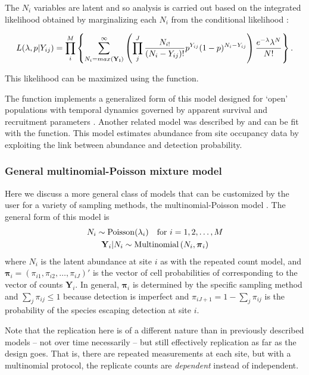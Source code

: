 \documentclass[article,shortnames]{jss}
\DeclareMathOperator{\Poi}{Poisson}
\DeclareMathOperator{\MN}{Multinomial}
\begin{document}
The $N_{i}$ variables are latent and so analysis is carried out based on 
the integrated likelihood obtained by marginalizing each $N_{i}$ from the 
conditional likelihood \citep{Royle2004b}:

\begin{equation}
L(\lambda, p | Y_{ij}) = 
 \prod_{i}^{M} 
 \left\{ \sum_{N_{i}=max({\bf Y_i})}^{\infty}
          \left( \prod_{j}^{J} 
     \frac{N_{i!}}{ (N_{i}-Y_{ij})!} p^{Y_{ij}}(1-p)^{N_{i}-Y_{ij}} \right)
       \frac{e^{-\lambda} \lambda^N}{N!} \right\}.
\end{equation}

This likelihood can be maximized using the  function.  

The function  implements a generalized form of this model
designed for `open' populations with temporal dynamics governed by 
apparent survival and recruitment parameters \citep{DailMadsen2011}. Another
related model was described by \citet{Royle2003} and can be fit with the 
 function. This model estimates abundance from site occupancy data  
by exploiting the link between abundance and detection probability. 
     
\subsubsection{General multinomial-Poisson mixture model}
\label{sec:gener-mult-poiss}
Here we discuss a more general class of models that can be customized by the
user for a variety of sampling methods, the multinomial-Poisson model
\citep{Royle2004a}.   The general form of this model is
\begin{gather}
\label{eq:mp2}
  N_i \sim \Poi(\lambda_i) \text{\quad for $i=1,2,\dots,M$}  \notag \\
  \mathbf Y_i | N_{i} \sim \MN\left(N_i, \boldsymbol \pi_i \right) \notag \\
\end{gather}
where $N_i$ is the latent abundance at site $i$ as with the repeated
count model, and $\boldsymbol \pi_i=(\pi_{i1},\pi_{i2},\dots,\pi_{iJ})'$ is
the vector of cell probabilities of corresponding to the vector of counts 
$\mathbf Y_{i}$.  In general, $\boldsymbol \pi_i$ is
determined by the specific sampling method and
$\sum_{j} \pi_{ij} \le 1$ because detection is imperfect and
$\pi_{iJ+1}=1 - \sum_{j} \pi_{ij}$  is the probability of the species
escaping detection at site $i$.  

Note that the replication here is of a different 
nature than in previously described models -- not over time necessarily -- 
but still effectively replication as far as the design goes. That is, 
there are repeated measurements at each site, but with a multinomial protocol, 
the replicate counts are {\it dependent} instead of independent. 
\end{document}
